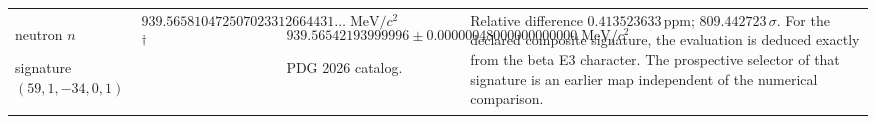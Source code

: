 \begin{longtable}{@{}>{\raggedright\arraybackslash}p{}>{\raggedright\arraybackslash}p{}>{\raggedright\arraybackslash}p{}>{\raggedright\arraybackslash}p{}@{}}
neutron $n$\par signature $(59,\allowbreak 1,\allowbreak -34,\allowbreak 0,\allowbreak 1)$ & $939.565810\allowbreak{}472507\allowbreak{}023312\allowbreak{}664431\ldots\;\mathrm{MeV}/c^2$\textsuperscript{\(\dagger\)} & $939.565421\allowbreak{}939999\allowbreak{}96\pm 0.000000\allowbreak{}480000\allowbreak{}000000\allowbreak{}00\;\mathrm{MeV}/c^2$\par\footnotesize PDG 2026 catalog. & Relative difference $0.413523\allowbreak{}633\,\mathrm{ppm}$; $809.442723\,\sigma$. For the declared composite signature, the evaluation is deduced exactly from the beta E3 character. The prospective selector of that signature is an earlier map independent of the numerical comparison. \\
\end{longtable}
\endgroup
